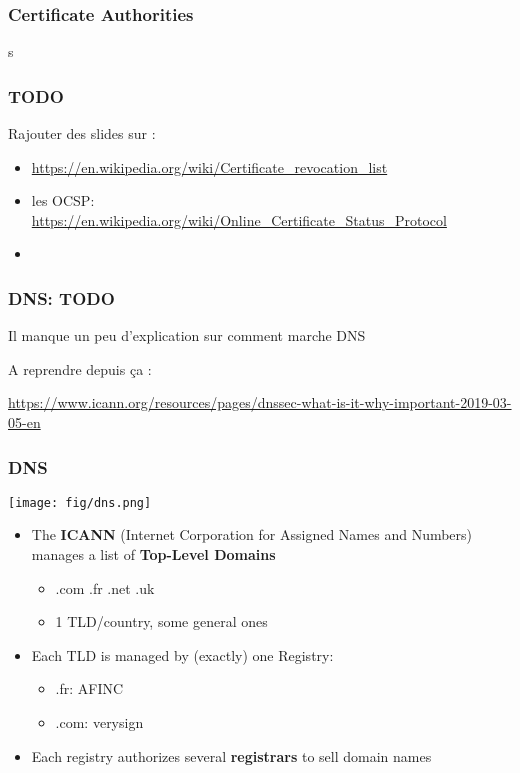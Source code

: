 \documentclass[
hyperref={pdfpagelabels=false}
,xcolor=table
]
{beamer}
\begin{document}
\begin{frame}
  \frametitle{Certificate Authorities}
  \begin{center}
    s
  \end{center}
\end{frame}


\begin{frame}
  \frametitle{TODO}

  Rajouter des slides sur :

  \begin{itemize}
  \item \url{https://en.wikipedia.org/wiki/Certificate_revocation_list}
  \item les OCSP: \url{https://en.wikipedia.org/wiki/Online_Certificate_Status_Protocol}
  \item 
  \end{itemize}
\end{frame}


\begin{frame}
  \frametitle{DNS: TODO}

  Il manque un peu d'explication sur comment marche DNS

  A reprendre depuis ça : 
  
  \url{https://www.icann.org/resources/pages/dnssec-what-is-it-why-important-2019-03-05-en}
\end{frame}


\begin{frame}
  \frametitle{DNS}

  \begin{center}
    \texttt{[image: fig/dns.png]}
  \end{center}
 
  \begin{itemize}
  \item The \textbf{ICANN} (Internet Corporation for Assigned Names and Numbers) manages a list of \textbf{Top-Level Domains}
    \begin{itemize}
    \item .com .fr .net .uk
    \item 1 TLD/country, some general ones
    \end{itemize}
  \item Each TLD is managed by (exactly) one Registry:
    \begin{itemize}
    \item .fr: AFINC
    \item .com: verysign
    \end{itemize}
  \item Each registry authorizes several \textbf{registrars} to sell domain names
  \end{itemize}
\end{frame}
\end{document}
